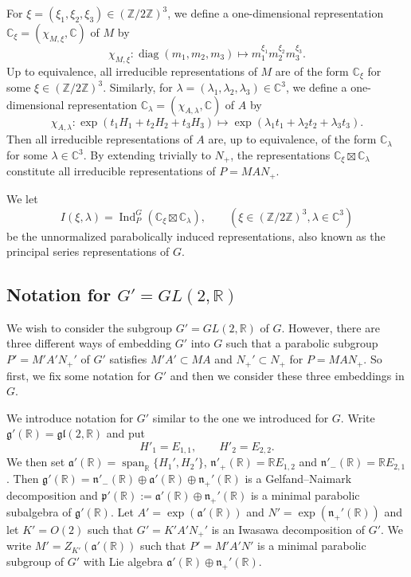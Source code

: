 \documentclass[a4paper,11pt,reqno]{amsart}
\newcommand{\fraka}{\mathfrak{a}}
\newcommand{\frakg}{\mathfrak{g}}
\newcommand{\frakn}{\mathfrak{n}}
\newcommand{\frakp}{\mathfrak{p}}
\newcommand{\CC}{\mathbb{C}}
\newcommand{\RR}{\mathbb{R}}
\newcommand{\ZZ}{\mathbb{Z}}
\newcommand{\0}{{\bf 0}}
\newcommand{\1}{{\bf 1}}
\DeclareMathOperator{\Ind}{Ind}
\DeclareMathOperator{\Span}{span}
\DeclareMathOperator{\diag}{diag}
\theoremstyle{plain}
\theoremstyle{definition}
\numberwithin{equation}{section}
\theoremstyle{definition}
\begin{document}
For $\xi=(\xi_1,\xi_2,\xi_3)\in (\ZZ/2\ZZ)^3$, we define a one-dimensional representation $\CC_\xi=(\chi_{M,\xi},\CC)$ of $M$ by 
\begin{equation}\label{eqn:characterM}
\chi_{M,\xi}\colon
\diag(m_1,m_2,m_3) \mapsto m_1^{\xi_1}m_2^{\xi_2}m_3^{\xi_3}.
\end{equation}
Up to equivalence, all irreducible representations of $M$ are of the form $\CC_\xi$ for some $\xi\in (\ZZ/2\ZZ)^3$. Similarly, for $\lambda=(\lambda_1,\lambda_2,\lambda_3)\in \CC^3$, we define a one-dimensional representation $\CC_\lambda=(\chi_{A,\lambda},\CC)$ of $A$ by
\begin{equation}\label{eqn:characterA}
\chi_{A,\lambda}\colon
\exp(t_1H_1+t_2H_2+t_3H_3)\mapsto \exp(\lambda_1t_1+\lambda_2t_2+\lambda_3t_3).
\end{equation}
Then all irreducible representations of $A$ are, up to equivalence,  
of the form $\CC_\lambda$ for some $\lambda\in \CC^3$.
By extending trivially to $N_+$, the representations $\CC_\xi\boxtimes \CC_\lambda$ constitute all irreducible representations of $P=MAN_+$. 

We let 
\[
I(\xi,\lambda)=\Ind_P^G(\CC_\xi\boxtimes\CC_\lambda),\qquad (\xi\in (\ZZ/2\ZZ)^3,\lambda\in \CC^3)
\]
be the unnormalized parabolically induced representations, also known as the principal series representations of $G$.

\subsection{Notation for \texorpdfstring{$G'=GL(2,\RR)$}{G'=GL(2,R)}}

We wish to consider the subgroup $G'=GL(2,\RR)$ of $G$.
However, there are three different ways of embedding $G'$ into $G$ such that
a parabolic subgroup $P'=M'A'N_+'$ of $G'$ satisfies
$M'A' \subset MA$ and $N_+'\subset N_+$ for $P=MAN_+$.
So first, we fix some notation for $G'$ and then we consider these three embeddings in $G$. 

We introduce notation for $G'$ similar to the one we introduced for $G$. 
Write $\frakg'(\RR) = \mathfrak{gl}(2,\RR)$ and put 
\[
H'_1=E_{1,1},\qquad H'_2=E_{2,2}.
\]
We then set 
$\fraka'(\RR)=\Span_\RR\{H_1',H_2'\}$, 
$\frakn'_{+}(\RR)=\RR E_{1,2}$ and $\frakn'_-(\RR)=\RR E_{2,1}$.
Then $\frakg'(\RR)=\frakn'_-(\RR)\oplus \fraka'(\RR)\oplus \frakn_+'(\RR)$ is a Gelfand--Naimark decomposition and 
$\frakp'(\RR):=\fraka'(\RR)\oplus \frakn_+'(\RR)$ is a minimal parabolic subalgebra of $\frakg'(\RR)$. Let $A'=\exp(\fraka'(\RR))$ and $N'=\exp(\frakn_+'(\RR))$ and let $K'=O(2)$ such that $G'=K'A'N_+'$ is an Iwasawa decomposition of $G'$. We write $M'=Z_{K'}(\fraka'(\RR))$ such that $P'=M'A'N'$ is a minimal parabolic subgroup of $G'$ with Lie algebra $\fraka'(\RR)\oplus \frakn_+'(\RR)$.
\end{document}
